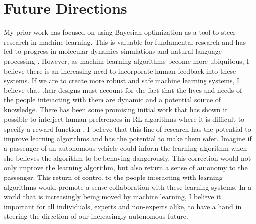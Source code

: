\section*{Future Directions}
My prior work has focused on using Bayesian optimization as a tool to steer research in machine learning. This is valuable for fundamental research and has led to progress in molecular dynamics simulations \cite{Bhomik2018Clustering} and natural language processing \cite{Gao2017HAN}. However, as machine learning algorithms become more ubiquitous, I believe there is an increasing need to incorporate human feedback into these systems. If we are to create more robust and safe machine learning systems, I believe that their designs must account for the fact that the lives and needs of the people interacting with them are dynamic and a potential source of knowledge. There has been some promising initial work that has shown it possible to interject human preferences in RL algorithms where it is difficult to specify a reward function \cite{ChristianoLBMLA17}. I believe that this line of research has the potential to improve learning algorithms and has the potential to make them safer. Imagine if a passenger of an autonomous vehicle could inform the learning algorithm when she believes the algorithm to be behaving dangerously. This correction would not only improve the learning algorithm, but also return a sense of autonomy to the passenger. This return of control to the people interacting with learning algorithms would promote a sense collaboration with these learning systems. In a world that is increasingly being moved by machine learning, I believe it important for all individuals, experts and non-experts alike, to have a hand in steering the direction of our increasingly autonomous future.
